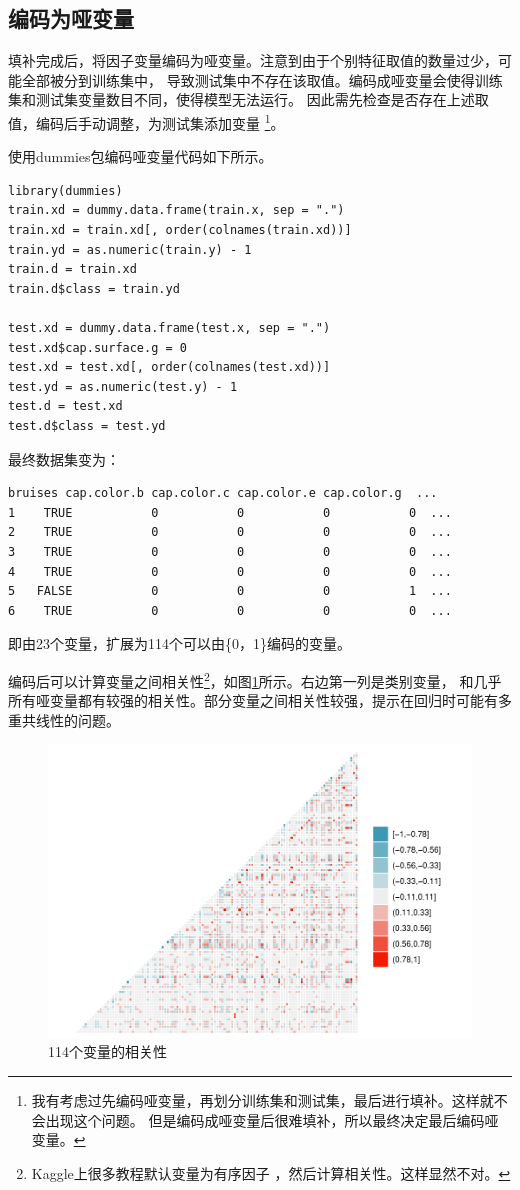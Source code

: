 \documentclass[lang=cn,11pt,a4paper,cite=super]{elegantpaper}
\begin{document}
\subsection{编码为哑变量}
填补完成后，将因子变量编码为哑变量。注意到由于个别特征取值的数量过少，可能全部被分到训练集中，
导致测试集中不存在该取值。编码成哑变量会使得训练集和测试集变量数目不同，使得模型无法运行。
因此需先检查是否存在上述取值，编码后手动调整，为测试集添加变量
\footnote{我有考虑过先编码哑变量，再划分训练集和测试集，最后进行填补。这样就不会出现这个问题。
但是编码成哑变量后很难填补，所以最终决定最后编码哑变量。}。
\par 使用dummies包编码哑变量代码如下所示。
\begin{lstlisting}[style=R]
library(dummies)
train.xd = dummy.data.frame(train.x, sep = ".")
train.xd = train.xd[, order(colnames(train.xd))]
train.yd = as.numeric(train.y) - 1
train.d = train.xd
train.d$class = train.yd

test.xd = dummy.data.frame(test.x, sep = ".")
test.xd$cap.surface.g = 0
test.xd = test.xd[, order(colnames(test.xd))]
test.yd = as.numeric(test.y) - 1
test.d = test.xd
test.d$class = test.yd
\end{lstlisting}
\par 最终数据集变为：
\begin{lstlisting}[style=R]
  bruises cap.color.b cap.color.c cap.color.e cap.color.g  ...
1    TRUE           0           0           0           0  ...
2    TRUE           0           0           0           0  ...
3    TRUE           0           0           0           0  ...
4    TRUE           0           0           0           0  ...
5   FALSE           0           0           0           1  ...
6    TRUE           0           0           0           0  ...
\end{lstlisting}
即由23个变量，扩展为114个可以由\{0，1\}编码的变量。
\par 编码后可以计算变量之间相关性\footnote{Kaggle上很多教程默认变量为有序因子
，然后计算相关性。这样显然不对。}，如图\ref{fig:cor}所示。右边第一列是类别变量，
和几乎所有哑变量都有较强的相关性。部分变量之间相关性较强，提示在回归时可能有多重共线性的问题。
\begin{figure}[htb]
   \centering
   \includegraphics[width=\textwidth]{img/cor-1.pdf}
   \caption{114个变量的相关性}
   \label{fig:cor}
\end{figure}
\end{document}
